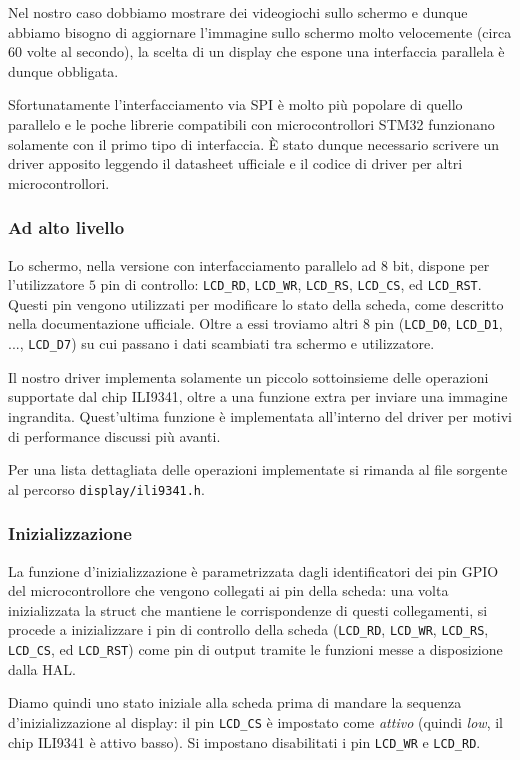 \documentclass[hidelinks,12pt]{article}
\begin{document}
Nel nostro caso dobbiamo mostrare dei videogiochi sullo schermo e dunque
abbiamo bisogno di aggiornare l'immagine sullo schermo molto velocemente
(circa 60 volte al secondo), la scelta di un display che espone una
interfaccia parallela è dunque obbligata.

Sfortunatamente l'interfacciamento via SPI è molto più popolare di quello
parallelo e le poche librerie compatibili con microcontrollori STM32 funzionano
solamente con il primo tipo di interfaccia.
È stato dunque necessario scrivere un driver apposito leggendo il datasheet
ufficiale\cite{ili9341} e il codice di driver per altri microcontrollori.

\subsubsection{Ad alto livello}
Lo schermo, nella versione con interfacciamento parallelo ad 8 bit, dispone
per l'utilizzatore $5$ pin di controllo: \texttt{LCD\_RD}, \texttt{LCD\_WR},
\texttt{LCD\_RS}, \texttt{LCD\_CS}, ed \texttt{LCD\_RST}.
Questi pin vengono utilizzati per modificare lo stato della scheda, come
descritto nella documentazione ufficiale.
Oltre a essi troviamo altri $8$ pin (\texttt{LCD\_D0}, \texttt{LCD\_D1}, ...,
\texttt{LCD\_D7}) su cui passano i dati scambiati tra schermo e utilizzatore.

Il nostro driver implementa solamente un piccolo sottoinsieme delle operazioni
supportate dal chip ILI9341, oltre a una funzione extra per inviare
una immagine ingrandita.
Quest'ultima funzione è implementata all'interno del driver per motivi di
performance discussi più avanti.

Per una lista dettagliata delle operazioni implementate si rimanda al file
sorgente al percorso
\texttt{display/ili9341.h}.

\subsubsection{Inizializzazione}
La funzione d'inizializzazione è parametrizzata dagli identificatori dei pin
GPIO del microcontrollore che vengono collegati ai pin della scheda: una volta
inizializzata la struct che mantiene le corrispondenze di questi collegamenti,
si procede a inizializzare i pin di controllo della scheda (\texttt{LCD\_RD},
\texttt{LCD\_WR}, \texttt{LCD\_RS}, \texttt{LCD\_CS}, ed \texttt{LCD\_RST}) come
pin di output tramite le funzioni messe a disposizione dalla HAL.

Diamo quindi uno stato iniziale alla scheda prima di mandare la sequenza
d'inizializzazione al display:
il pin \texttt{LCD\_CS} è impostato come \textit{attivo} (quindi \textit{low},
il chip ILI9341 è attivo basso).
Si impostano disabilitati i pin \texttt{LCD\_WR} e \texttt{LCD\_RD}.
\end{document}
